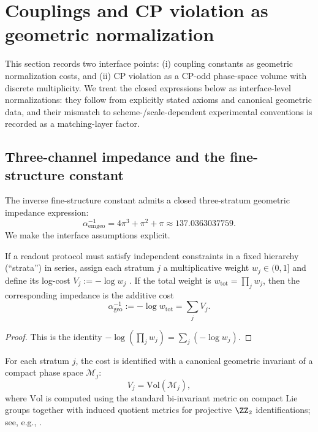 
\section{Couplings and CP violation as geometric normalization}
\label{sec:couplings_cp}

This section records two interface points: (i) coupling constants as geometric normalization costs, and (ii) CP violation as a CP-odd phase-space volume with discrete multiplicity.
We treat the closed expressions below as interface-level normalizations: they follow from explicitly stated axioms and canonical geometric data, and their mismatch to scheme-/scale-dependent experimental conventions is recorded as a matching-layer factor.

\subsection{Three-channel impedance and the fine-structure constant}
\label{subsec:alpha_impedance}

The inverse fine-structure constant admits a closed three-stratum geometric impedance expression:
\begin{equation}\label{eq:alpha_geo}
\alpha_{\mathrm{em}}^{-1}{}_{\mathrm{geo}}=4\pi^3+\pi^2+\pi\approx 137.0363037759.
\end{equation}
We make the interface assumptions explicit.

\begin{proposition}\label{ax:serial_impedance}
If a readout protocol must satisfy independent constraints in a fixed hierarchy (``strata'') in series, assign each stratum $j$ a multiplicative weight $w_j\in(0,1]$ and define its log-cost $V_j:=-\log w_j$ \cite{Shannon1948,CoverThomas2006}.
If the total weight is $w_{\mathrm{tot}}=\prod_j w_j$, then the corresponding impedance is the additive cost
\[
\alpha_{\mathrm{geo}}^{-1}:=-\log w_{\mathrm{tot}}=\sum_j V_j.
\]
\end{proposition}
\begin{proof}
This is the identity $-\log\!\left(\prod_j w_j\right)=\sum_j (-\log w_j)$.
\end{proof}

\begin{axiom}\label{ax:impedance_volume}
For each stratum $j$, the cost is identified with a canonical geometric invariant of a compact phase space $\mathcal{M}_j$:
\[
V_j=\mathrm{Vol}(\mathcal{M}_j),
\]
where $\mathrm{Vol}$ is computed using the standard bi-invariant metric on compact Lie groups together with induced quotient metrics for projective $\ZZ_2$ identifications; see, e.g., \cite{Nakahara2003,HallLieGroups2015}.
\end{axiom}

